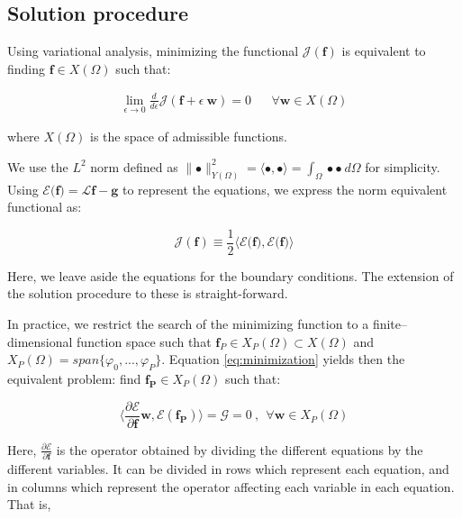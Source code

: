 \documentclass{CFD2011}
\begin{document}
\subsection{Solution procedure}
Using variational analysis, minimizing the functional $\mathcal{J}(\mathbf{f})$ is equivalent to finding $\mathbf{f} \in X(\Omega)$ such that:

\begin{eqnarray}
\lim_{\epsilon \to 0} \frac{d}{d\epsilon}{\mathcal{J}(\mathbf{f}+\epsilon \ \mathbf{w})}=0 && \forall \mathbf{w} \in X(\Omega)
\label{eq:minimization}
\end{eqnarray}

\noindent where $X(\Omega)$ is the space of admissible functions.

We use the $L^2$ norm defined as $\parallel \bullet  \parallel_{Y(\Omega)}^2= \langle \bullet, \bullet \rangle= \int_\Omega  \bullet \bullet   \ d\Omega$ for simplicity. Using $\mathcal{E} {(}\mathbf{f} {)}=\mathcal{L}\mathbf{f}-\mathbf{g}$ to represent the equations, we express the norm equivalent functional as:

\begin{equation}
\mathcal{J}(\mathbf{f})\equiv  \frac{1}{2} \langle \mathcal{E} {(}\mathbf{f} {)},\mathcal{E} {(}\mathbf{f} {)} \rangle
\end{equation}

Here, we leave aside the equations for the boundary conditions. The extension of the solution procedure to these is straight-forward. 

In practice, we restrict the search of the minimizing function to a finite--dimensional function space such that $\mathbf{f}_P \in X_P(\Omega) \subset X(\Omega)$ and $X_P(\Omega)= span\{ \varphi_0,...,\varphi_P \} $.
Equation \ref{eq:minimization} yields then the equivalent problem: find $\mathbf{f_P} \in X_P(\Omega)$ such that:

\begin{equation}
\big\langle \frac{\partial\mathcal{E}}{\partial \mathbf{f}}\mathbf{w} , \mathcal{E}(\mathbf{f_P}) \big\rangle=\mathcal{G}=0 \ ,\ \ \forall \mathbf{w}\in X_P(\Omega)
\end{equation}


Here, $\frac{\partial\mathcal{E}}{\partial \mathbf{f}}$ is the operator obtained by dividing the different equations by the different variables. It can be divided in rows which represent each equation, and in columns which represent the operator affecting each variable in each equation. That is,
\end{document}
